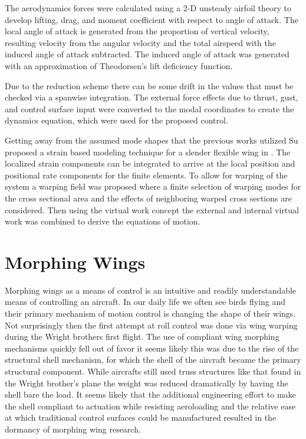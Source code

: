\documentclass[11pt]{ucthesis}
\begin{document}
The aerodynamics forces were calculated using a 2-D unsteady airfoil theory to develop lifting, drag, and moment coefficient with respect to angle of attack. The local angle of attack is generated from the proportion of vertical velocity, resulting velocity from the angular velocity and the total airspeed with the induced angle of attack subtracted. The induced angle of attack was generated with an approximation of Theodorsen's lift deficiency function.

Due to the reduction scheme there can be some drift in the values that must be checked via a spanwise integration. The external force effects due to thrust, gust, and control surface input were converted to the modal coordinates to create the dynamics equation, which were used for the proposed control.

Getting away from the assumed mode shapes that the previous works utilized Su proposed a strain based modeling technique for a slender flexible wing in \cite{su2014modified}. The localized strain components can be integrated to arrive at the local position and positional rate components for the finite elements. To allow for warping of the system a warping field was proposed where a finite selection of warping modes for the cross sectional area and the effects of neighboring warped cross sections are considered. Then using the virtual work concept the external and internal virtual work was combined to derive the equations of motion.

\section{Morphing Wings}
Morphing wings as a means of control is an intuitive and readily understandable means of controlling an aircraft. In our daily life we often see birds flying and their primary mechanism of motion control is changing the shape of their wings. Not surprisingly then the first attempt at roll control was done via wing warping during the Wright brothers first flight. \cite{friswell2009prospects} The use of compliant wing morphing mechanisms quickly fell out of favor it seems likely this was due to the rise of the structural shell mechanism, for which the shell of the aircraft became the primary structural component. While aircrafts still used truss structures like that found in the Wright brother's plane the weight was reduced dramatically by having the shell bare the load. \cite{weisshaar2011aerospace} It seems likely that the additional engineering effort to make the shell compliant to actuation while resisting aeroloading and the relative ease at which traditional control surfaces could be manufactured resulted in the dormancy of morphing wing research.
\end{document}
